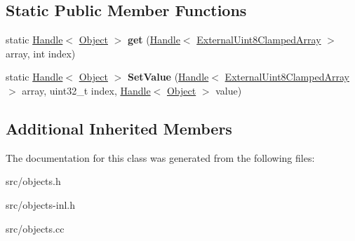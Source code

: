 \subsection*{Static Public Member Functions}
\begin{DoxyCompactItemize}
\item 
\hypertarget{classv8_1_1internal_1_1_external_uint8_clamped_array_a837e9d745e5a04b0f11f2576d182b090}{}static \hyperlink{classv8_1_1internal_1_1_handle}{Handle}$<$ \hyperlink{classv8_1_1internal_1_1_object}{Object} $>$ {\bfseries get} (\hyperlink{classv8_1_1internal_1_1_handle}{Handle}$<$ \hyperlink{classv8_1_1internal_1_1_external_uint8_clamped_array}{External\+Uint8\+Clamped\+Array} $>$ array, int index)\label{classv8_1_1internal_1_1_external_uint8_clamped_array_a837e9d745e5a04b0f11f2576d182b090}

\item 
\hypertarget{classv8_1_1internal_1_1_external_uint8_clamped_array_adafd9dc0f396b82145e6d558786518fa}{}static \hyperlink{classv8_1_1internal_1_1_handle}{Handle}$<$ \hyperlink{classv8_1_1internal_1_1_object}{Object} $>$ {\bfseries Set\+Value} (\hyperlink{classv8_1_1internal_1_1_handle}{Handle}$<$ \hyperlink{classv8_1_1internal_1_1_external_uint8_clamped_array}{External\+Uint8\+Clamped\+Array} $>$ array, uint32\+\_\+t index, \hyperlink{classv8_1_1internal_1_1_handle}{Handle}$<$ \hyperlink{classv8_1_1internal_1_1_object}{Object} $>$ value)\label{classv8_1_1internal_1_1_external_uint8_clamped_array_adafd9dc0f396b82145e6d558786518fa}

\end{DoxyCompactItemize}
\subsection*{Additional Inherited Members}


The documentation for this class was generated from the following files\+:\begin{DoxyCompactItemize}
\item 
src/objects.\+h\item 
src/objects-\/inl.\+h\item 
src/objects.\+cc\end{DoxyCompactItemize}
